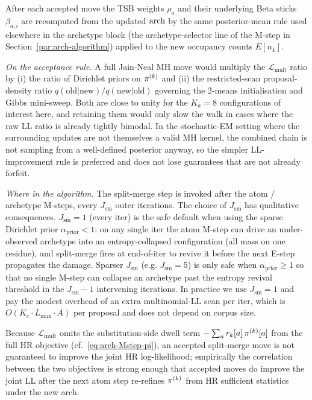 After each accepted move the TSB weights $\rho_a$ and their underlying
Beta sticks $\beta_{a, i}$ are recomputed from the updated $\mathrm{arch}$ by
the same posterior-mean rule used elsewhere in the archetype block
(the archetype-selector line of the M-step in Section~\ref{par:arch-algorithm})
applied to the new occupancy counts $E[n_k]$.

\emph{On the acceptance rule.} A full Jain-Neal MH move would multiply
the $\mathcal{L}_{\text{mult}}$ ratio by (i) the ratio of Dirichlet
priors on $\pi^{(k)}$ and (ii) the restricted-scan proposal-density
ratio $q(\text{old} | \text{new}) / q(\text{new} | \text{old})$
governing the 2-means initialisation and Gibbs mini-sweep. Both are
close to unity for the $K_a{=}8$ configurations of interest here, and
retaining them would only slow the walk in cases where the raw LL
ratio is already tightly bimodal. In the stochastic-EM setting where
the surrounding updates are not themselves a valid MH kernel, the
combined chain is not sampling from a well-defined posterior anyway,
so the simpler LL-improvement rule is preferred and does not lose
guarantees that are not already forfeit.

\emph{Where in the algorithm.} The split-merge step is invoked after
the atom / archetype M-steps, every $J_{\text{sm}}$ outer iterations.
The choice of $J_{\text{sm}}$ has qualitative consequences.
$J_{\text{sm}}{=}1$ (every iter) is the safe default when using the
sparse Dirichlet prior $\alpha_{\text{prior}} < 1$: on any single iter
the atom M-step can drive an under-observed archetype into an
entropy-collapsed configuration (all mass on one residue), and
split-merge fires at end-of-iter to revive it before the next E-step
propagates the damage. Sparser $J_{\text{sm}}$ (e.g. $J_{\text{sm}}{=}5$)
is only safe when
$\alpha_{\text{prior}} \geq 1$ so that no single M-step can collapse
an archetype past the entropy revival threshold in the
$J_{\text{sm}}{-}1$ intervening iterations. In practice we use
$J_{\text{sm}}{=}1$ and pay the modest overhead of an extra
multinomial-LL scan per iter, which is $O(K_c \cdot L_{\max} \cdot A)$
per proposal and does not depend on corpus size.

Because $\mathcal{L}_{\text{mult}}$ omits the substitution-side dwell
term $-\sum_a r_k[a]\,\pi^{(k)}[a]$ from the full HR objective
(cf.\ \eqref{eq:arch-Mstep-pi}), an accepted split-merge move is not
guaranteed to improve the joint HR log-likelihood; empirically the
correlation between the two objectives is strong enough that accepted
moves do improve the joint LL after the next atom step re-refines
$\pi^{(k)}$ from HR sufficient statistics under the new arch.

